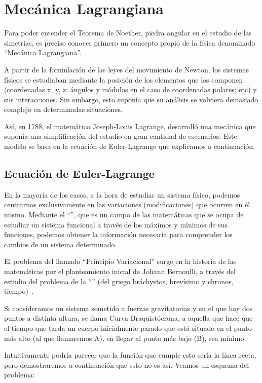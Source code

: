\section{Mecánica Lagrangiana}\label{sec:mecánica-lagrangiana}
Para poder entender el Teorema de Noether, piedra angular en el estudio de las simetrías, es preciso conocer primero un concepto propio de la física denominado ``Mecánica Lagrangiana''.

A partir de la formulación de las leyes del movimiento de Newton, los sistemas físicos se estudiaban mediante la posición de los elementos que los componen (coordenadas x, y, z; ángulos y módulos en el caso de coordenadas polares; etc) y sus interacciones.
Sin embargo, esto suponía que su análisis se volviera demasiado complejo en determinadas situaciones.

Así, en 1788, el matemático Joseph-Louis Lagrange, desarrolló una mecánica que suponía una simplificación del estudio en gran cantidad de escenarios. Este modelo se basa en la ecuación de Euler-Lagrange que explicamos a continuación.

\subsection{Ecuación de Euler-Lagrange}\label{subsec:ecuación-de-euler-lagrange}
En la mayoría de los casos, a la hora de estudiar un sistema físico, podemos centrarnos exclusivamente en las variaciones (modificaciones) que ocurren en él mismo. Mediante el ``'', que es un campo de las matemáticas que se ocupa de estudiar un sistema funcional a través de los máximos y mínimos de sus funciones, podemos obtener la información necesaria para comprender los cambios de un sistema determinado.

El problema del llamado ``Principio Variacional'' surge en la historia de las matemáticas por el planteamiento inicial de Johann Bernoulli, a través del estudio del problema de la ``'' (del griego bráchystos, brevísimo y chronos, tiempo)~\cite{AE}.

Si consideramos un sistema sometido a fuerzas gravitatorias y en el que hay dos puntos a distinta altura, se llama Curva Braquistócrona, a aquella que hace que el tiempo que tarda un cuerpo inicialmente parado que está situado en el punto más alto (al que llamaremos A), en llegar al punto más bajo (B), sea mínimo.

Intuitivamente podría parecer que la función que cumple esto sería la línea recta, pero demostraremos a continuación que esto no es así. Veamos un esquema del problema:

